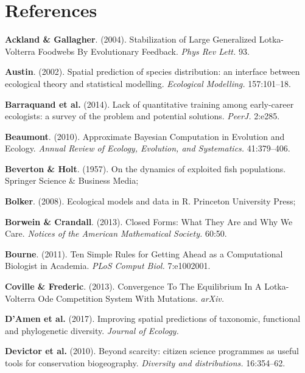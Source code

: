 \documentclass[11pt,serif]{article}
\begin{document}
\section*{References}\label{references}

\hypertarget{refs}{}
\hypertarget{ref-AckGal04}{}
\textbf{Ackland \& Gallagher}. (2004). Stabilization of Large
Generalized Lotka-Volterra Foodwebs By Evolutionary Feedback. \emph{Phys
Rev Lett.} 93.

\hypertarget{ref-Aus02}{}
\textbf{Austin}. (2002). Spatial prediction of species distribution: an
interface between ecological theory and statistical modelling.
\emph{Ecological Modelling.} 157:101--18.

\hypertarget{ref-BarEza14}{}
\textbf{Barraquand et al.} (2014). Lack of quantitative training among
early-career ecologists: a survey of the problem and potential
solutions. \emph{PeerJ.} 2:e285.

\hypertarget{ref-Bea10}{}
\textbf{Beaumont}. (2010). Approximate Bayesian Computation in Evolution
and Ecology. \emph{Annual Review of Ecology, Evolution, and
Systematics.} 41:379--406.

\hypertarget{ref-BevHol57}{}
\textbf{Beverton \& Holt}. (1957). On the dynamics of exploited fish
populations. Springer Science \& Business Media;

\hypertarget{ref-Bol08}{}
\textbf{Bolker}. (2008). Ecological models and data in R. Princeton
University Press;

\hypertarget{ref-BorCra13}{}
\textbf{Borwein \& Crandall}. (2013). Closed Forms: What They Are and
Why We Care. \emph{Notices of the American Mathematical Society.} 60:50.

\hypertarget{ref-Bou11}{}
\textbf{Bourne}. (2011). Ten Simple Rules for Getting Ahead as a
Computational Biologist in Academia. \emph{PLoS Comput Biol.}
7:e1002001.

\hypertarget{ref-CovFre13}{}
\textbf{Coville \& Frederic}. (2013). Convergence To The Equilibrium In
A Lotka-Volterra Ode Competition System With Mutations. \emph{arXiv.}

\hypertarget{ref-DAMat17}{}
\textbf{D'Amen et al.} (2017). Improving spatial predictions of
taxonomic, functional and phylogenetic diversity. \emph{Journal of
Ecology.}

\hypertarget{ref-DevWhi10}{}
\textbf{Devictor et al.} (2010). Beyond scarcity: citizen science
programmes as useful tools for conservation biogeography.
\emph{Diversity and distributions.} 16:354--62.
\end{document}
